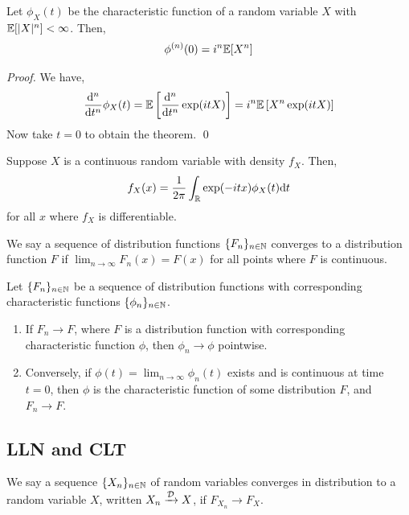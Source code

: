 \documentclass[12pt]{article}
\begin{document}
\begin{theorem}
Let \( \phi_X(t) \) be the characteristic function of a random variable \( X \) with \( \EE[|X|^n] < \infty \). Then,
\begin{align*}
    \phi^{(n)}(0) = i^n \EE[X^n]
\end{align*}
\end{theorem}

\begin{proof}
We have,
\begin{align*}
    \dd[n]{}{t}\phi_X(t) = \EE \left[ \dd[n]{}{t} \exp(itX) \right]
    = i^n \EE \left[ X^n \exp(itX) \right]
\end{align*}
Now take \( t=0 \) to obtain the theorem. \qed
\end{proof}

\begin{theorem}[Inversion]
Suppose \( X \) is a continuous random variable with density \( f_X \). Then,
\begin{align*}
    f_X(x) = \dfrac{1}{2\pi}\int_\RR \exp(-it x)\phi_X(t)\d t
\end{align*}
for all \( x \) where \( f_X \) is differentiable.
\end{theorem}

\begin{definition}
We say a sequence of distribution functions \( \{F_n\}_{n\in\NN} \) converges to a distribution function \( F \) if \( \lim_{n\to\infty} F_n(x) = F(x) \) for all points where \( F \) is continuous.
\end{definition}

\begin{theorem}[Continuity]
Let \( \{F_n\}_{n\in\NN} \) be a sequence of distribution functions with corresponding characteristic functions \( \{\phi_n\}_{n\in\NN} \).
\begin{enumerate}[nolistsep]
    \item If \( F_n\to F \), where \( F \) is a distribution function with corresponding characteristic function \( \phi \), then \( \phi_n\to\phi \) pointwise.
    \item Conversely, if \( \phi(t) = \lim_{n\to\infty} \phi_n(t) \) exists and is continuous at time \( t=0 \), then \( \phi \) is the characteristic function of some distribution \( F \), and \( F_n\to F \).
\end{enumerate}

\end{theorem}

\subsection{LLN and CLT}
\begin{definition}
We say a sequence \( \{X_n\}_{n\in\NN} \) of random variables converges in distribution to a random variable \( X \), written \( X_n \xrightarrow{\cD} X \), if \( F_{X_n} \to F_X \).
\end{definition}
\end{document}
